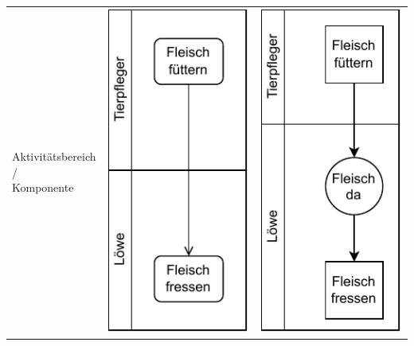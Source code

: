 \begin{longtable}{p{\sttpHilfA}|c|c}
			\parbox{\sttpHilfA}{\centering
				Aktivitätsbereich \\ / \\ Komponente} 
		& 
			\parbox{\sttpHilfB}{\centering
				\vspace{\sttpAbstandRand}
				\includegraphics[scale=\sttpFaktor]{Bilder/Kapitel-5/gegenueberstellung_4a.pdf}
				\vspace{\sttpAbstandRand}
			} 
		& 
			\parbox{\sttpHilfB}{\centering
				\vspace{\sttpAbstandRand}
				\includegraphics[scale=\sttpFaktor]{Bilder/Kapitel-5/gegenueberstellung_4b.pdf}
				\vspace{\sttpAbstandRand}
			} 
		\\
		

\end{longtable}
